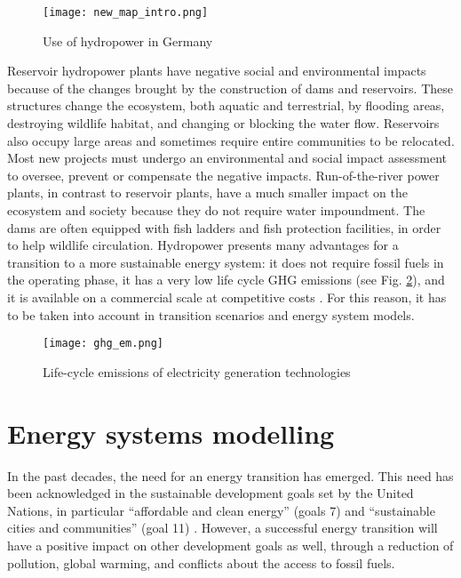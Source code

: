 \begin{figure}[H]
\centering
\texttt{[image: new\_map\_intro.png]}
\caption[Use of hydropower in Germany]{Use of hydropower in Germany}
\label{hp_de}
\end{figure}

Reservoir hydropower plants have negative social and environmental impacts because of the changes brought by the construction of dams and reservoirs. These structures change the ecosystem, both aquatic and terrestrial, by flooding areas, destroying wildlife habitat, and changing or blocking the water flow. Reservoirs also occupy large areas and sometimes require entire communities to be relocated. Most new projects must undergo an environmental and social impact assessment to oversee, prevent or compensate the negative impacts. Run-of-the-river power plants, in contrast to reservoir plants, have a much smaller impact on the ecosystem and society because they do not require water impoundment. The dams are often equipped with fish ladders and fish protection facilities, in order to help wildlife circulation. \newline 
Hydropower presents many advantages for a transition to a more sustainable energy system: it does not require fossil fuels in the operating phase, it has a very low life cycle GHG emissions (see Fig. \ref{ghg_em}), and it is available on a commercial scale at competitive costs \cite{hp_europe}. For this reason, it has to be taken into account in transition scenarios and energy system models. 

\begin{figure}[H]
\centering
\texttt{[image: ghg\_em.png]}
\caption[Life-cycle emissions of electricity generation technologies]{Life-cycle emissions of electricity generation technologies \cite{hp_europe}}
\label{ghg_em}
\end{figure}


\section{Energy systems modelling}

In the past decades, the need for an energy transition has emerged. This need has been acknowledged in the sustainable development goals \cite{un_sdgs} set by the United Nations, in particular ``affordable and clean energy'' (goals 7) \cite{un_sdg7} and ``sustainable cities and communities'' (goal 11) \cite{un_sdg11}. However, a successful energy transition will have a positive impact on other development goals as well, through a reduction of pollution, global warming, and conflicts about the access to fossil fuels. \newline

